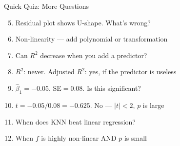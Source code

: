 \documentclass[aspectratio=169, 11pt]{beamer}
\begin{document}
\begin{frame}{Quick Quiz: More Questions}

\begin{enumerate}
  \setcounter{enumi}{4}
  \item Residual plot shows U-shape. What's wrong?
  \pause
  \item[]{\textcolor{muted}{\footnotesize Non-linearity --- add polynomial or transformation}}

  \vspace{0.3em}
  \item Can $R^2$ decrease when you add a predictor?
  \pause
  \item[]{\textcolor{muted}{\footnotesize $R^2$: never. Adjusted $R^2$: yes, if the predictor is useless}}

  \vspace{0.3em}
  \item $\hat{\beta}_1 = -0.05$, $\text{SE} = 0.08$. Is this significant?
  \pause
  \item[]{\textcolor{muted}{\footnotesize $t = -0.05/0.08 = -0.625$. No --- $|t| < 2$, $p$ is large}}

  \vspace{0.3em}
  \item When does KNN beat linear regression?
  \pause
  \item[]{\textcolor{muted}{\footnotesize When $f$ is highly non-linear AND $p$ is small}}
\end{enumerate}
\end{frame}
\end{document}

